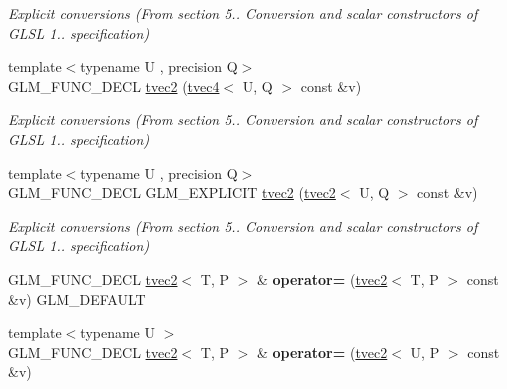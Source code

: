 \begin{DoxyCompactItemize}
\begin{DoxyCompactList}\small\item\em Explicit conversions (From section 5.. Conversion and scalar constructors of G\-L\-S\-L 1.. specification) \end{DoxyCompactList}\item 
\hypertarget{structglm_1_1tvec2_a1cca234edbe71fe7b5045303634f18f5}{{\footnotesize template$<$typename U , precision Q$>$ }\\G\-L\-M\-\_\-\-F\-U\-N\-C\-\_\-\-D\-E\-C\-L \hyperlink{structglm_1_1tvec2_a1cca234edbe71fe7b5045303634f18f5}{tvec2} (\hyperlink{structglm_1_1tvec4}{tvec4}$<$ U, Q $>$ const \&v)}\label{structglm_1_1tvec2_a1cca234edbe71fe7b5045303634f18f5}

\begin{DoxyCompactList}\small\item\em Explicit conversions (From section 5.. Conversion and scalar constructors of G\-L\-S\-L 1.. specification) \end{DoxyCompactList}\item 
\hypertarget{structglm_1_1tvec2_ade5fee8102e97b6e189ac72d2e10b2d9}{{\footnotesize template$<$typename U , precision Q$>$ }\\G\-L\-M\-\_\-\-F\-U\-N\-C\-\_\-\-D\-E\-C\-L G\-L\-M\-\_\-\-E\-X\-P\-L\-I\-C\-I\-T \hyperlink{structglm_1_1tvec2_ade5fee8102e97b6e189ac72d2e10b2d9}{tvec2} (\hyperlink{structglm_1_1tvec2}{tvec2}$<$ U, Q $>$ const \&v)}\label{structglm_1_1tvec2_ade5fee8102e97b6e189ac72d2e10b2d9}

\begin{DoxyCompactList}\small\item\em Explicit conversions (From section 5.. Conversion and scalar constructors of G\-L\-S\-L 1.. specification) \end{DoxyCompactList}\item 
\hypertarget{structglm_1_1tvec2_af80d08c6419d329c7df4d622429e1d79}{G\-L\-M\-\_\-\-F\-U\-N\-C\-\_\-\-D\-E\-C\-L \hyperlink{structglm_1_1tvec2}{tvec2}$<$ T, P $>$ \& {\bfseries operator=} (\hyperlink{structglm_1_1tvec2}{tvec2}$<$ T, P $>$ const \&v) G\-L\-M\-\_\-\-D\-E\-F\-A\-U\-L\-T}\label{structglm_1_1tvec2_af80d08c6419d329c7df4d622429e1d79}

\item 
\hypertarget{structglm_1_1tvec2_a90eca373f8d7c27d73412f242cf1551e}{{\footnotesize template$<$typename U $>$ }\\G\-L\-M\-\_\-\-F\-U\-N\-C\-\_\-\-D\-E\-C\-L \hyperlink{structglm_1_1tvec2}{tvec2}$<$ T, P $>$ \& {\bfseries operator=} (\hyperlink{structglm_1_1tvec2}{tvec2}$<$ U, P $>$ const \&v)}\label{structglm_1_1tvec2_a90eca373f8d7c27d73412f242cf1551e}


\end{DoxyCompactItemize}
